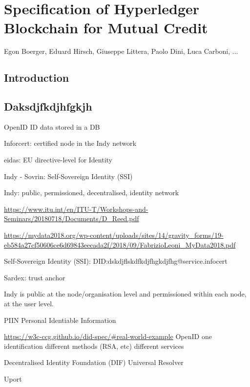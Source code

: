 \chapter{Specification of Hyperledger Blockchain for Mutual Credit}
\label{ch:bchain}

\vspace{-1cm}
\begin{center}
Egon Boerger, Eduard Hirsch, Giuseppe Littera, Paolo Dini, Luca Carboni, ...
\end{center}

\section{Introduction}


\section{Daksdjfkdjhfgkjh}



OpenID
ID data stored in a DB


Inforcert: certified node in the Indy network

eidas: EU directive-level for Identity

Indy - Sovrin: Self-Sovereign Identity (SSI)



Indy: public, permissioned, decentralised, identity network



\url{https://www.itu.int/en/ITU-T/Workshops-and-Seminars/20180718/Documents/D_Reed.pdf}

\url{https://mydata2018.org/wp-content/uploads/sites/14/gravity_forms/19-eb584a27cf50606ce6d69843eecada2f/2018/09/FabrizioLeoni_MyData2018.pdf}



Self-Sovereign Identity (SSI):
DID:dskdjflskdfkdjfhgkdjfhg@service.infocert


Sardex: trust anchor


Indy is public at the node/organisation level and permissioned within each node, at the user level.


PIIN
Personal Identiable Information


\url{https://w3c-ccg.github.io/did-spec/#real-world-example}
OpenID
one identification
different methods (RSA, etc)
different services


Decentralised Identity Foundation (DIF)
Universal Resolver



Uport











